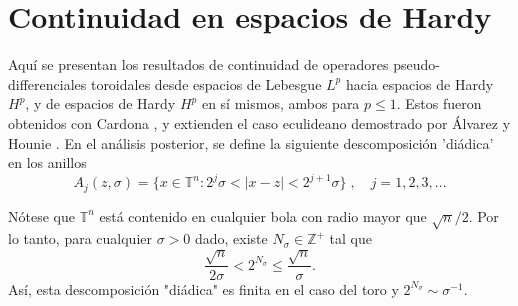 \section{Continuidad en espacios de Hardy}
Aquí se presentan los resultados de continuidad de operadores pseudo-differenciales toroidales desde espacios de Lebesgue $L^p$ hacia espacios de Hardy $H^p$, y de espacios de Hardy $H^p$ en sí mismos, ambos para $p\leq 1$. Estos fueron obtenidos con Cardona \cite{cardona-martinez-II}, y extienden el caso eculideano demostrado por \'Alvarez y Hounie \cite{alvarez-hounie}. En el análisis posterior, se define la siguiente descomposición 'diádica' en los anillos
\begin{equation}
	A_j(z, \sigma) = \{ x \in \mathbb{T}^n : 2^j\sigma < |x-z|<2^{j+1}\sigma \} \; , \quad j=1, 2, 3, ...
\end{equation}
\begin{remark}
	Nótese que $\mathbb{T}^n$ está contenido en cualquier bola con radio mayor que $\sqrt{n}/2$. Por lo tanto, para cualquier $\sigma>0$ dado, existe $N_\sigma\in \mathbb{Z}^+$ tal que 
	\begin{equation}
		\frac{\sqrt{n}}{2\sigma} < 2^{N_\sigma} \leq \frac{\sqrt{n}}{\sigma}.
	\end{equation}
	Así, esta descomposición "diádica" es finita en el caso del toro y $2^{N_\sigma} \sim \sigma^{-1}$.
	\label{rem:N-sigma}
\end{remark}
